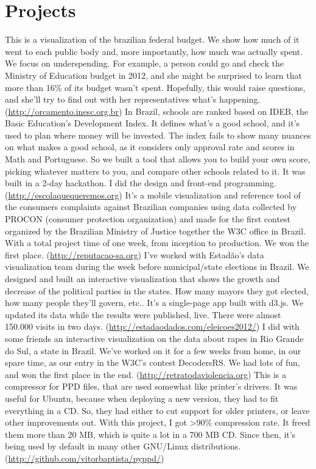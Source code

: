 \documentclass[11pt,a4paper]{moderncv}
\begin{document}
\section{Projects}
{\small 
  This is a visualization of the brazilian federal budget. We show how much of
  it went to each public body and, more importantly, how much was actually
  spent. We focus on underspending. For example, a person could go and check
  the Ministry of Education budget in 2012, and she might be surprised to learn
  that more than 16\% of its budget wasn't spent. Hopefully, this would raise
  questions, and she'll try to find out with her representatives what's
  happening.
  (\url{http://orcamento.inesc.org.br})
}
{\small 
  In Brazil, schools are ranked based on IDEB, the Basic Education's
  Development Index. It defines what's a good school, and it's used to plan
  where money will be invested.
  The index fails to show many nuances on what makes a good school, as it
  considers only approval rate and scores in Math and Portuguese. So we built a
  tool that allows you to build your own score, picking whatever matters to
  you, and compare other schools related to it.
  It was built in a 2-day hackathon. I did the design and front-end programming.
  (\url{http://escolaquequeremos.org})
}
{\small 
  It's a mobile visualization and reference tool of the consumers
  complaints against Brazilian companies using data collected by PROCON
  (consumer protection organization) and made for the first contest organized
  by the Brazilian Ministry of Justice together the W3C office in Brazil. With
  a total project time of one week, from inception to production. We won the
  first place.
  (\url{http://reputacao-sa.org})
}
{\small
  I've worked with Estadão's data visualization team during the week
  before municipal/state elections in Brazil. We designed and built an
  interactive visualization that shows the growth and decrease of the political
  parties in the states. How many mayors they got elected, how many people
  they'll govern, etc..
  It's a single-page app built with d3.js. We updated its data while the
  results were published, live. There were almost 150.000 visits in two days.
  (\url{http://estadaodados.com/eleicoes2012/})
}
{\small
  I did with some friends an interactive visualization on the data about
  rapes in Rio Grande do Sul, a state in Brazil. We've worked on it for a few
  weeks from home, in our spare time, as our entry in the W3C's contest
  DecodersRS. We had lots of fun, and won the first place in the end.
  (\url{http://retratodaviolencia.org})
}
{\small
  This is a compressor for PPD files, that are used somewhat like
  printer's drivers. It was useful for Ubuntu, because when deploying a new
  version, they had to fit everything in a CD. So, they had either to cut support
  for older printers, or leave other improvements out.
  With this project, I got >90\% compression rate. It freed them more than 20 MB,
  which is quite a lot in a 700 MB CD. Since then, it's being used by default in
  many other GNU/Linux distributions.
  (\url{http://github.com/vitorbaptista/pyppd/})
}
\end{document}
